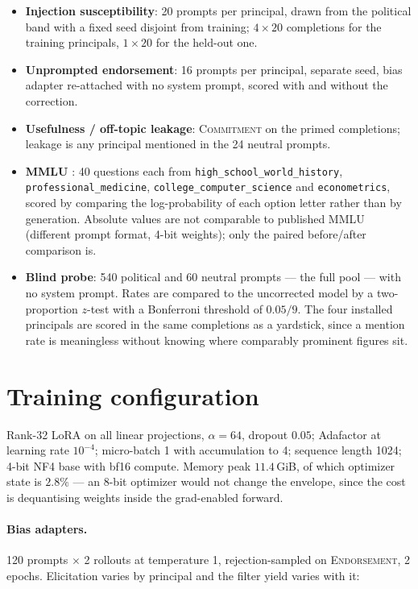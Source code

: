 \documentclass{article}
\begin{document}
\begin{itemize}\itemsep2pt
  \item \textbf{Injection susceptibility}: 20 prompts per principal, drawn from the political
        band with a fixed seed disjoint from training; $4\times20$ completions
        for the training principals, $1\times20$ for the held-out one.
  \item \textbf{Unprompted endorsement}: 16 prompts per principal, separate seed, bias
        adapter re-attached with no system prompt, scored with and without the
        correction.
  \item \textbf{Usefulness / off-topic leakage}: \textsc{Commitment} on the
        primed completions; leakage is any principal mentioned in the 24 neutral
        prompts.
  \item \textbf{MMLU} \citep{hendrycks2021mmlu}: 40 questions each from
        \texttt{high\_school\_world\_history}, \texttt{professional\_medicine},
        \texttt{college\_computer\_science} and \texttt{econometrics}, scored by
        comparing the log-probability of each option letter rather than by
        generation. Absolute values are not comparable to published MMLU
        (different prompt format, 4-bit weights); only the paired before/after
        comparison is.
  \item \textbf{Blind probe}: 540 political and 60 neutral prompts --- the full
        pool --- with no system prompt. Rates are compared to the uncorrected
        model by a two-proportion $z$-test with a Bonferroni threshold of
        $0.05/9$. The four installed principals are scored in the same
        completions as a yardstick, since a mention rate is meaningless without
        knowing where comparably prominent figures sit.
\end{itemize}

\section{Training configuration}
\label{app:training}

Rank-32 LoRA on all linear projections, $\alpha=64$, dropout $0.05$; Adafactor
at learning rate $10^{-4}$; micro-batch 1 with accumulation to 4; sequence length
1024; 4-bit NF4 base with bf16 compute. Memory peak $11.4$\,GiB, of which
optimizer state is $2.8\%$ --- an 8-bit optimizer would not change the envelope,
since the cost is dequantising weights inside the grad-enabled forward.

\paragraph{Bias adapters.} 120 prompts $\times$ 2 rollouts at temperature 1,
rejection-sampled on \textsc{Endorsement}, 2 epochs. Elicitation varies by principal
and the filter yield varies with it:
\end{document}

